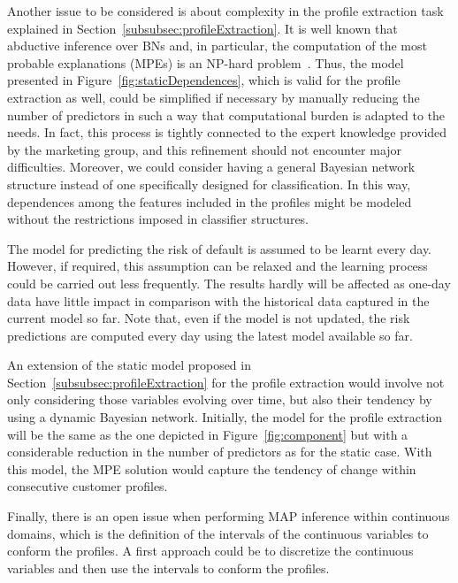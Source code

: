 Another issue to be considered is about complexity in the profile extraction task explained in Section~\ref{subsubsec:profileExtraction}. It is well known that abductive inference over BNs and, in particular, the computation of the most probable explanations (MPEs) is an NP-hard problem~\cite{Shi94}. Thus, the model presented in Figure~\ref{fig:staticDependences}, which is valid for the profile extraction as well, could be simplified if necessary
by manually reducing the number of predictors in such a way that computational burden is adapted to the needs. In fact, this process is tightly connected to the expert knowledge provided by the marketing group, and this refinement should not encounter major difficulties. Moreover, we could consider having a general Bayesian network structure instead of one specifically designed for classification. In this way, dependences among the features included in the profiles might be modeled without the restrictions imposed in classifier structures.

The model for predicting the risk of default is assumed to be learnt every day. However, if required, this assumption can be relaxed and the learning process could be carried out less frequently. The results hardly will be affected as one-day data have little impact in comparison with the historical data captured in the current model so far. Note that, even if the model is not updated, the risk predictions are computed every day using the latest model available so far.

An extension of the static model proposed in Section~\ref{subsubsec:profileExtraction} for the profile extraction would involve not only considering those variables evolving over time, but also their tendency by using a dynamic Bayesian network. Initially, the model for the profile extraction will be the same as the one depicted in Figure~\ref{fig:component} but with a considerable reduction in the number of predictors as for the static case. With this model, the MPE solution would capture the tendency of change within consecutive customer profiles. 

Finally, there is an open issue when performing MAP inference within continuous domains, which is the definition of the intervals of the continuous variables to conform the profiles. A first approach could be to discretize the continuous variables and then use the intervals to conform the profiles. 





